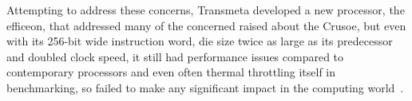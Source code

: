Attempting to address these concerns, Transmeta developed a new processor, the
efficeon, that addressed many of the concerned raised about the Crusoe, but even
with its 256-bit wide instruction word, die size twice as large as its
predecessor and doubled clock speed, it still had performance issues compared to
contemporary processors and even often thermal throttling itself in
benchmarking, so failed to make any significant impact in the computing
world~\cite{TrackingTransmetaEfficeon}.
